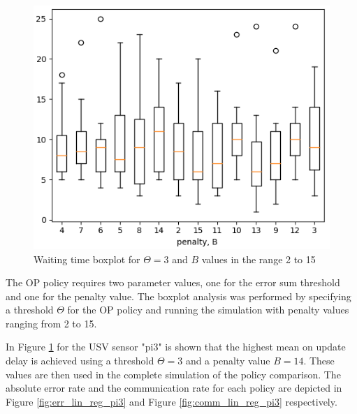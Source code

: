 \documentclass{mpaper}
\begin{document}
\begin{figure}[h]
    \centering
    \includegraphics[scale=0.4]{imgs/boxplot_linreg_waiting_pi3.png}
    \caption{Waiting time boxplot for $\Theta=3$ and $B$ values in the range 2 to 15}
    \label{fig:boxplot_linreg}
\end{figure}

The OP policy requires two parameter values, one for the error sum threshold and one for the penalty value. The boxplot analysis was performed by specifying a threshold $\Theta$ for the OP policy and running the simulation with penalty values ranging from 2 to 15. 

In Figure \ref{fig:boxplot_linreg} for the USV sensor "pi3" is shown that the highest mean on update delay is achieved using a threshold $\Theta = 3$ and a penalty value $B=14$.
These values are then used in the complete simulation of the policy comparison. The absolute error rate and the communication rate for each policy are depicted in Figure \ref{fig:err_lin_reg_pi3} and Figure \ref{fig:comm_lin_reg_pi3} respectively.
\end{document}
